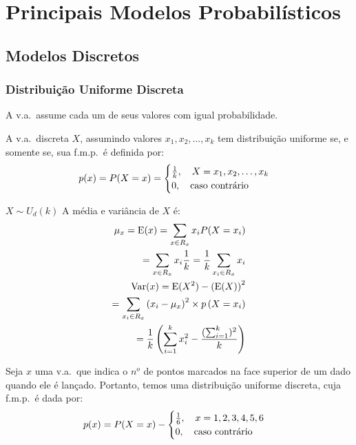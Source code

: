 \chapter{Principais Modelos Probabilísticos}
 \section{Modelos Discretos}
 \subsection{Distribuição Uniforme Discreta}
 \begin{description}
   \item  A v.a.\ assume cada um de seus valores com igual probabilidade.
   \item[Definição] A v.a.\ discreta $X$, assumindo valores $x_1,x_2,\dots,x_k$ tem 
 distribuição uniforme se, e somente se, sua f.m.p.\ é definida por: 
 \begin{align}
   p(x)=P(X=x)=\begin{cases}
     \frac{1}{k}, \text{\quad} X=x_1,x_2,\dots,x_k\\
     0, \text{\quad caso contrário}
   \end{cases}
 \end{align}
\item  [Notação:] $X \sim U_{d}(k)$
 A média e variância de $X$ é:
 \begin{align}
   \mu_{x}=\operatorname{E}(x)=\sum_{x \in R_{x}}x_i P(X=x_i)\\ \nonumber
   = \sum_{x \in R_{x}}x_i \frac{1}{k}= \frac{1}{k}\sum_{x_i \in R_{x}} x_i\\
   \operatorname{Var}(x)=\operatorname{E}(X^2)-\left(\operatorname{E}(X)\right)^2\\ \nonumber
   = \sum_{x_i \in R_{x}}\left(x_i -\mu_x \right)^2 \times p\left(X=x_i \right)\\  
   =\frac{1}{k} \left(\sum^k_{i=1} x_i^2 - \frac{(\sum_{i=1}^k)^2}{k}\right) \nonumber
 \end{align}
 \begin{example} Seja $x$ uma v.a.\ que indica o $n^o$ de pontos marcados na face 
   superior de um dado quando ele é lançado. Portanto, temos uma distribuição 
   uniforme discreta, cuja f.m.p.\ é dada por: 
   \begin{align}
     p(x)=P(X=x)-\begin{cases}
       \frac{1}{6},\text{\quad} x=1,2,3,4,5,6\\
       0, \text{\quad caso contrário}
     \end{cases}

\end{align}
\end{example}
\end{description}
